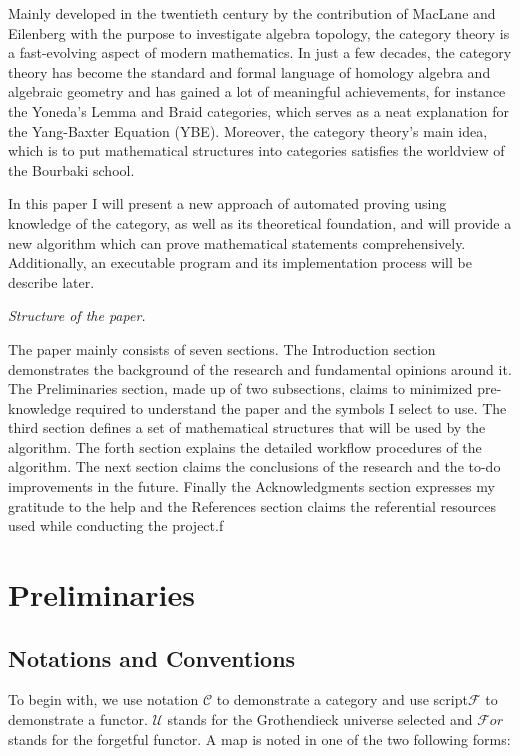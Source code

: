 \documentclass{article}
\begin{document}
Mainly developed in the twentieth century by the contribution of MacLane and Eilenberg with the purpose to investigate algebra topology, the category theory is a fast-evolving aspect of modern mathematics. In just a few decades, the category theory has become the standard and formal language of homology algebra and algebraic geometry and has gained a lot of meaningful achievements, for instance the Yoneda{'}s Lemma and Braid categories, which serves as a neat explanation for the Yang-Baxter Equation (YBE). Moreover, the category theory{'}s main idea, which is to put mathematical structures into categories satisfies the worldview of the Bourbaki school.

In this paper I will present a new approach of automated proving using knowledge of the category, as well as its theoretical foundation, and will provide a new algorithm which can prove mathematical statements comprehensively. Additionally, an executable program and its implementation process will be describe later.

\textit{ Structure of the paper.}

The paper mainly consists of seven sections. The Introduction section demonstrates the background of the research and fundamental opinions around it. The Preliminaries section, made up of two subsections, claims to minimized pre-knowledge required to understand the paper and the symbols I select to use. The third section defines a set of mathematical structures that will be used by the algorithm. The forth section explains the detailed workflow procedures of the algorithm. The next section claims the conclusions of the research and the to-do improvements in the future. Finally the Acknowledgments section expresses my gratitude to the help and the References section claims the referential resources used while conducting the project.f

\section*{Preliminaries}

\subsection*{Notations and Conventions}

To begin with, we use notation \(\mathcal{C}\) to demonstrate a category and use script\(\mathcal{F}\) to demonstrate a functor. \(\mathcal{U}\) stands for the Grothendieck universe selected and \(\mathcal{F}\mathit{o}\mathit{r}\) stands for the forgetful functor. A map is noted in one of the two following forms:
\end{document}
